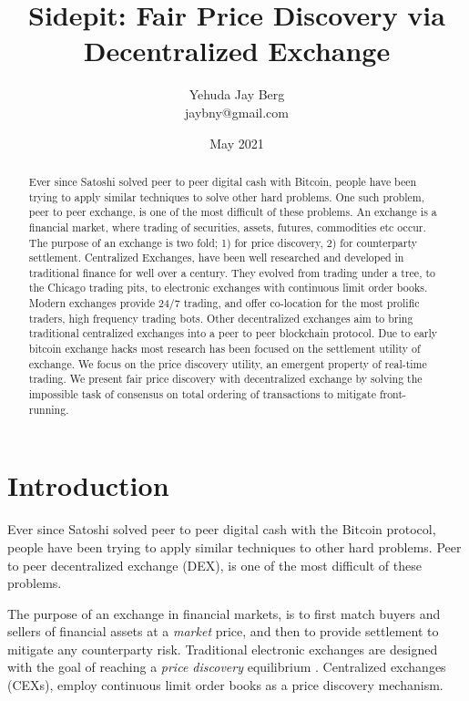 \documentclass[12pt]{article}
\title{Sidepit: Fair Price Discovery via Decentralized Exchange}
\author{Yehuda Jay Berg \\jaybny@gmail.com}
\date{May 2021}
\begin{document}
\parindent 0cm
\parskip   6pt
\maketitle




\begin{abstract}
Ever since  Satoshi  solved  peer  to  peer  digital  cash  with  Bitcoin,  people have  been  trying  to  apply  similar  techniques  to  solve  other  hard  problems. One such problem, peer to peer exchange, is one of the most difficult of these problems. An exchange is a financial market, where trading of securities, assets, futures, commodities etc occur. The purpose of an exchange is two fold;  1) for price discovery, 2) for counterparty settlement. Centralized Exchanges, have been well researched and developed in traditional finance for well over a century.  They evolved from trading under a tree, to the Chicago trading pits, to electronic exchanges with continuous limit order books. Modern exchanges provide 24/7 trading, and offer co-location for the most prolific traders, high frequency trading bots. Other decentralized exchanges aim to bring traditional centralized exchanges into a peer to peer blockchain protocol. Due to early bitcoin exchange hacks most research has been focused on the settlement utility of exchange. We focus on the price discovery utility, an emergent property of real-time trading. We present fair price discovery with decentralized exchange by solving the impossible task of consensus on total ordering of transactions to mitigate front-running.
\end{abstract}

\section{Introduction}
Ever since Satoshi solved peer to peer digital cash with the Bitcoin protocol, people have been trying to apply similar techniques to other hard problems. Peer to peer decentralized exchange (DEX), is one of the most difficult of these problems. 

The purpose of an exchange in financial markets, is to first match buyers and sellers of financial assets at a \emph{market} price, and then to provide settlement to mitigate any counterparty risk. Traditional electronic exchanges are designed with the goal of reaching a  \emph{price discovery} equilibrium \cite{francioni_schwartz_2017}. Centralized exchanges (CEXs), employ continuous limit order books as a price discovery mechanism. 
\end{document}
